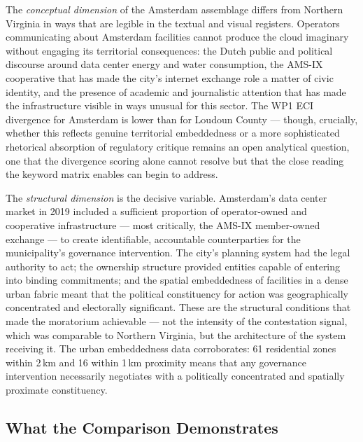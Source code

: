The \textit{conceptual dimension} of the Amsterdam assemblage differs from Northern Virginia in ways that are legible in the textual and visual registers. Operators communicating about Amsterdam facilities cannot produce the cloud imaginary without engaging its territorial consequences: the Dutch public and political discourse around data center energy and water consumption, the AMS-IX cooperative that has made the city's internet exchange role a matter of civic identity, and the presence of academic and journalistic attention that has made the infrastructure visible in ways unusual for this sector. The WP1 ECI divergence for Amsterdam is lower than for Loudoun County — though, crucially, whether this reflects genuine territorial embeddedness or a more sophisticated rhetorical absorption of regulatory critique remains an open analytical question, one that the divergence scoring alone cannot resolve but that the close reading the keyword matrix enables can begin to address.

The \textit{structural dimension} is the decisive variable. Amsterdam's data center market in 2019 included a sufficient proportion of operator-owned and cooperative infrastructure — most critically, the AMS-IX member-owned exchange — to create identifiable, accountable counterparties for the municipality's governance intervention. The city's planning system had the legal authority to act; the ownership structure provided entities capable of entering into binding commitments; and the spatial embeddedness of facilities in a dense urban fabric meant that the political constituency for action was geographically concentrated and electorally significant. These are the structural conditions that made the moratorium achievable --- not the intensity of the contestation signal, which was comparable to Northern Virginia, but the architecture of the system receiving it. The urban embeddedness data corroborates: 61 residential zones within 2\,km and 16 within 1\,km proximity means that any governance intervention necessarily negotiates with a politically concentrated and spatially proximate constituency.

\subsection{What the Comparison Demonstrates}

